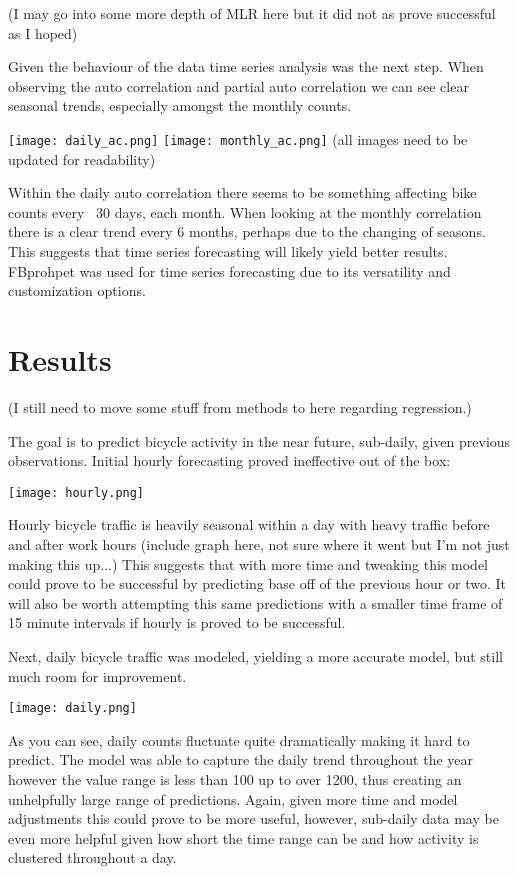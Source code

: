 \documentclass[twoside]{article}
\begin{document}
\begin{multicols}{2}
(I may go into some more depth of MLR here but it did not as prove successful as I hoped)  

Given the behaviour of the data time series analysis was the next step. When observing the auto correlation and partial auto correlation we can see clear seasonal trends, especially amongst the monthly counts.  

\texttt{[image: daily\_ac.png]}
\texttt{[image: monthly\_ac.png]}
(all images need to be updated for readability)  


Within the daily auto correlation there seems to be something affecting bike counts every ~30 days, each month. When looking at the monthly correlation there is a clear trend every 6 months, perhaps due to the changing of seasons. This suggests that time series forecasting will likely yield better results. FBprohpet was used for time series forecasting due to its versatility and customization options.

\section{Results}

(I still need to move some stuff from methods to here regarding regression.)  

The goal is to predict bicycle activity in the near future, sub-daily, given previous observations. Initial hourly forecasting proved ineffective out of the box:  

\texttt{[image: hourly.png]}

Hourly bicycle traffic is heavily seasonal within a day with heavy traffic before and after work hours (include graph here, not sure where it went but I'm not just making this up...) This suggests that with more time and tweaking this model could prove to be successful by predicting base off of the previous hour or two. It will also be worth attempting this same predictions with a smaller time frame of 15 minute intervals if hourly is proved to be successful.  

Next, daily bicycle traffic was modeled, yielding a more accurate model, but still much room for improvement. 

\texttt{[image: daily.png]}

As you can see, daily counts fluctuate quite dramatically making it hard to predict. The model was able to capture the daily trend throughout the year however the value range is less than 100 up to over 1200, thus creating an unhelpfully large range of predictions. Again, given more time and model adjustments this could prove to be more useful, however, sub-daily data may be even more helpful given how short the time range can be and how activity is clustered throughout a day.  


\end{multicols}
\end{document}
